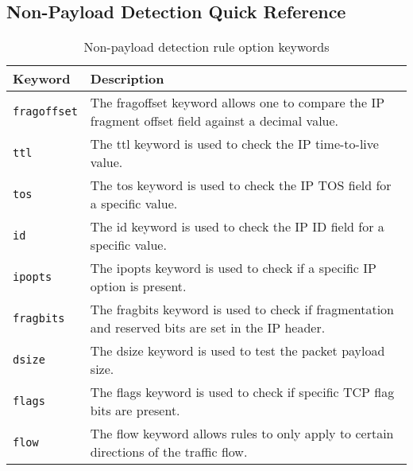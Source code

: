 \documentclass[english]{report}
\begin{document}
\subsection{Non-Payload Detection Quick Reference}
\begin{center}
\begin{longtable}[h]{| p{1in} | p{4.5in} |}
\caption{Non-payload detection rule option keywords} \\

\hline
Keyword & Description \\
\hline

\hline
\texttt{fragoffset} &

The fragoffset keyword allows one to compare the IP fragment offset field
against a decimal value. \\

\hline
\texttt{ttl} &

The ttl keyword is used to check the IP time-to-live value. \\

\hline
\texttt{tos} &

The tos keyword is used to check the IP TOS field for a specific value. \\

\hline
\texttt{id} &

The id keyword is used to check the IP ID field for a specific value. \\

\hline
\texttt{ipopts} &

The ipopts keyword is used to check if a specific IP option is present. \\

\hline
\texttt{fragbits} &

The fragbits keyword is used to check if fragmentation and reserved bits are
set in the IP header. \\

\hline
\texttt{dsize} &

The dsize keyword is used to test the packet payload size. \\

\hline
\texttt{flags} &

The flags keyword is used to check if specific TCP flag bits are present. \\

\hline
\texttt{flow} &

The flow keyword allows rules to only apply to certain directions of the
traffic flow. \\


\end{longtable}
\end{center}
\end{document}
